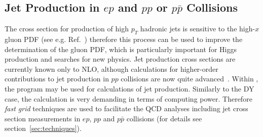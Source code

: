 
\subsection{Jet Production in $ep$ and $pp$ or $p \bar p$ Collisions}
\label{jetsection}

The cross section for production of high $p_T$ hadronic jets
is sensitive to the high-$x$ gluon 
PDF (see e.g. Ref.~\cite{MSTWpdf}) 
therefore this process can be used to improve the determination of the gluon PDF,
which is particularly important for Higgs production and searches for new physics.
Jet production cross sections are currently known only to NLO, although 
calculations for higher-order contributions to jet production in $pp$ collisions
are now quite advanced~\cite{nigel:2013,nigel:2010,Currie:2013dwa}. 
Within \fitter, the \nlojetpp program \cite{Nagy:1998bb,Nagy:2001fj} may be used for 
calculations of jet production.
Similarly to the DY case, the calculation 
is very demanding in terms of computing power. 
Therefore \emph{fast grid} techniques are used  
to facilitate the QCD analyses including jet cross section measurements
in $ep$, $pp$ and $p\bar{p}$ collisions
(for details see section~\ref{sec:techniques}).





